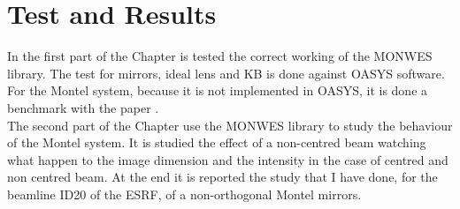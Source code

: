 \chapter{Test and Results}
\label{capitolo4}

\vspace{5cm}

In the first part of the Chapter is tested the correct working of the MONWES library. The test for mirrors, ideal lens and KB is done against OASYS software. For the Montel system, because it is not implemented in OASYS, it is done a benchmark with the paper \cite{resta2015nested}.
\\
The second part of the Chapter use the MONWES library to study the behaviour of the Montel system. It is studied the effect of a non-centred beam watching what happen to the image dimension and the intensity in the case of centred and non centred beam. At the end it is reported the study that I have done, for the beamline ID20 of the ESRF, of a non-orthogonal Montel mirrors.
\vspace{0.5cm}
